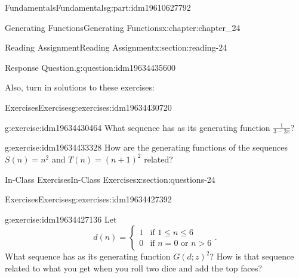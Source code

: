 \documentclass[oneside,10pt,]{book}
\numberwithin{equation}{section}
\newcommand{\gt}{>}
\begin{document}
\begin{partptx}{Fundamentals}{}{Fundamentals}{}{}{g:part:idm19610627792}
\begin{chapterptx}{Generating Functions}{}{Generating Functions}{}{}{x:chapter:chapter_24}
\begin{sectionptx}{Reading Assignment}{}{Reading Assignment}{}{}{x:section:reading-24}
\begin{question}{Response Question.}{g:question:idm19634435600}
\end{question}
Also, turn in solutions to these exercises:%
%
%
\typeout{************************************************}
\typeout{************************************************}
%
\begin{exercises-subsection-numberless}{Exercises}{}{Exercises}{}{}{g:exercises:idm19634430720}
\par\medskip\noindent%
%
\begin{exercisegroup}
\begin{divisionexerciseeg}{1}{}{}{g:exercise:idm19634430464}%
What sequence has as its generating function \(\frac{1}{3-2x}\)?%
\end{divisionexerciseeg}%
\begin{divisionexerciseeg}{2}{}{}{g:exercise:idm19634433328}%
How are the generating functions of the sequences \(S(n)=n^2\) and \(T(n)=(n+1)^2\) related?%
\end{divisionexerciseeg}%
\end{exercisegroup}
\par\medskip\noindent
\end{exercises-subsection-numberless}
\end{sectionptx}
%
%
\typeout{************************************************}
\typeout{************************************************}
%
\begin{sectionptx}{In-Class Exercises}{}{In-Class Exercises}{}{}{x:section:questions-24}
%
%
%
\typeout{************************************************}
\typeout{************************************************}
%
\begin{exercises-subsection-numberless}{Exercises}{}{Exercises}{}{}{g:exercises:idm19634427392}
\par\medskip\noindent%
%
\begin{exercisegroup}
\begin{divisionexerciseeg}{1}{}{}{g:exercise:idm19634427136}%
Let%
\begin{equation*}
d(n)=
\begin{cases}
1 & \textrm{if }1 \leq n \leq 6\\
0 & \textrm{if }n=0\textrm{ or }n \gt 6
\end{cases}.
\end{equation*}
What sequence has as its generating function \(G(d;z)^2\)?  How is that sequence related to what you get when you roll two dice and add the top faces?%
\end{divisionexerciseeg}%

\end{exercisegroup}
\end{exercises-subsection-numberless}
\end{sectionptx}
\end{chapterptx}
\end{partptx}
\end{document}
